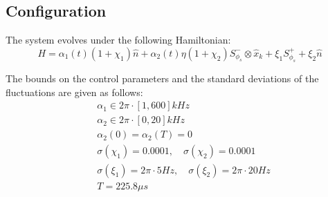 \documentclass{notes2}
\begin{document}
\subsection{Configuration}
The system evolves under the following Hamiltonian:
\begin{equation}
    H = \alpha_1(t) (1 + \chi_1)\hat n + \alpha_2(t) \eta(1+\chi_2)S^-_{\phi_s} \otimes \hat x_k + \xi_1 S_{\phi_s}^{+} + \xi_2 \hat n 
\end{equation}

The bounds on the control parameters and the standard deviations of the fluctuations are given as follows:
\begin{align*}
    &\alpha_1\in 2\pi \cdot[1, 600] kHz \\
    &\alpha_2\in 2\pi \cdot[0, 20] kHz \\
    &\alpha_2(0) = \alpha_2(T) = 0 \\
    &\sigma(\chi_1) = 0.0001,\quad \sigma(\chi_2) = 0.0001 \\
    &\sigma(\xi_1) = 2\pi \cdot 5Hz,\quad \sigma(\xi_2) = 2\pi \cdot 20Hz\\
    & T = 225.8 \mu s
\end{align*}

\nocite{*}
\printbibliography
\end{document}
